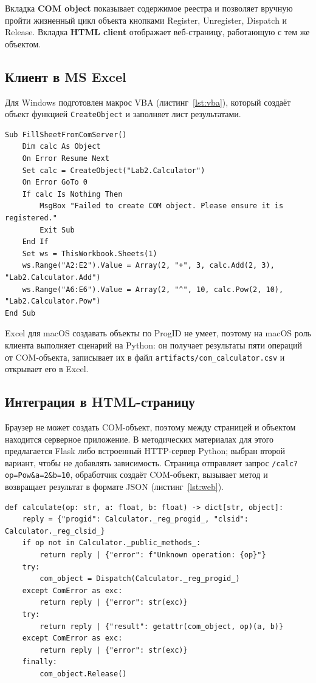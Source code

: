 \documentclass[14pt,a4paper]{extarticle}
\begin{document}
Вкладка \textbf{COM object} показывает содержимое реестра и позволяет вручную пройти
жизненный цикл объекта кнопками Register, Unregister, Dispatch и Release. Вкладка
\textbf{HTML client} отображает веб-страницу, работающую с тем же объектом.

\subsection{Клиент в MS Excel}

Для Windows подготовлен макрос VBA (листинг~\ref{lst:vba}), который создаёт объект
функцией \texttt{CreateObject} и заполняет лист результатами.

\begin{lstlisting}[style=plain, caption={Макрос VBA для Excel}, label={lst:vba}]
Sub FillSheetFromComServer()
    Dim calc As Object
    On Error Resume Next
    Set calc = CreateObject("Lab2.Calculator")
    On Error GoTo 0
    If calc Is Nothing Then
        MsgBox "Failed to create COM object. Please ensure it is registered."
        Exit Sub
    End If
    Set ws = ThisWorkbook.Sheets(1)
    ws.Range("A2:E2").Value = Array(2, "+", 3, calc.Add(2, 3), "Lab2.Calculator.Add")
    ws.Range("A6:E6").Value = Array(2, "^", 10, calc.Pow(2, 10), "Lab2.Calculator.Pow")
End Sub
\end{lstlisting}

Excel для macOS создавать объекты по ProgID не умеет, поэтому на macOS роль клиента
выполняет сценарий на Python: он получает результаты пяти операций от COM-объекта,
записывает их в файл \texttt{artifacts/com\_calculator.csv} и открывает его в Excel.

\subsection{Интеграция в HTML-страницу}

Браузер не может создать COM-объект, поэтому между страницей и объектом находится
серверное приложение. В методических материалах для этого предлагается Flask либо
встроенный HTTP-сервер Python; выбран второй вариант, чтобы не добавлять зависимость.
Страница отправляет запрос \texttt{/calc?op=Pow\&a=2\&b=10}, обработчик создаёт
COM-объект, вызывает метод и возвращает результат в формате JSON
(листинг~\ref{lst:web}).

\begin{lstlisting}[style=python, caption={Серверная часть HTML-клиента}, label={lst:web}]
def calculate(op: str, a: float, b: float) -> dict[str, object]:
    reply = {"progid": Calculator._reg_progid_, "clsid": Calculator._reg_clsid_}
    if op not in Calculator._public_methods_:
        return reply | {"error": f"Unknown operation: {op}"}
    try:
        com_object = Dispatch(Calculator._reg_progid_)
    except ComError as exc:
        return reply | {"error": str(exc)}
    try:
        return reply | {"result": getattr(com_object, op)(a, b)}
    except ComError as exc:
        return reply | {"error": str(exc)}
    finally:
        com_object.Release()
\end{lstlisting}
\end{document}
